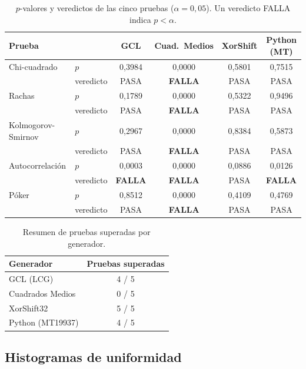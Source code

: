 \documentclass[11pt]{article}
\begin{document}
\begin{table}[H]
\centering
\small
\begin{tabular}{llcccc}
\toprule
\textbf{Prueba} & & \textbf{GCL} & \textbf{Cuad.\ Medios} & \textbf{XorShift} & \textbf{Python (MT)} \\
\midrule
Chi-cuadrado     & $p$ & 0,3984 & 0,0000 & 0,5801 & 0,7515 \\
                 & veredicto & PASA & \textbf{FALLA} & PASA & PASA \\
\addlinespace
Rachas           & $p$ & 0,1789 & 0,0000 & 0,5322 & 0,9496 \\
                 & veredicto & PASA & \textbf{FALLA} & PASA & PASA \\
\addlinespace
Kolmogorov-Smirnov & $p$ & 0,2967 & 0,0000 & 0,8384 & 0,5873 \\
                 & veredicto & PASA & \textbf{FALLA} & PASA & PASA \\
\addlinespace
Autocorrelaci\'on  & $p$ & 0,0003 & 0,0000 & 0,0886 & 0,0126 \\
                 & veredicto & \textbf{FALLA} & \textbf{FALLA} & PASA & \textbf{FALLA} \\
\addlinespace
P\'oker          & $p$ & 0,8512 & 0,0000 & 0,4109 & 0,4769 \\
                 & veredicto & PASA & \textbf{FALLA} & PASA & PASA \\
\bottomrule
\end{tabular}
\caption{$p$-valores y veredictos de las cinco pruebas
($\alpha = 0{,}05$). Un veredicto FALLA indica $p < \alpha$.}
\label{tab:resultados}
\end{table}

\begin{table}[H]
\centering
\begin{tabular}{lc}
\toprule
\textbf{Generador} & \textbf{Pruebas superadas} \\
\midrule
GCL (LCG)          & 4 / 5 \\
Cuadrados Medios   & 0 / 5 \\
XorShift32         & 5 / 5 \\
Python (MT19937)   & 4 / 5 \\
\bottomrule
\end{tabular}
\caption{Resumen de pruebas superadas por generador.}
\label{tab:resumen}
\end{table}

\subsection{Histogramas de uniformidad}
\end{document}

